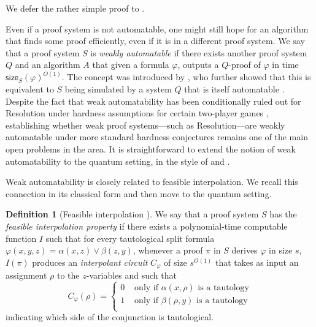 \documentclass[11pt]{article}
\theoremstyle{definition}
\newtheorem{definition}{Definition}[section]
\theoremstyle{plain}
\theoremstyle{remark}
\newcommand{\size}[2]{\mathsf{size}_{#1}(#2)}
\begin{document}
We defer the rather simple proof to .

Even if a proof system is not automatable, one might still hope for an algorithm that finds some proof efficiently, even if it is in a different proof system. We say that a proof system $S$ is \emph{weakly automatable} if there exists another proof system $Q$ and an algorithm $A$ that given a formula $\varphi$, outputs a $Q$-proof of $\varphi$ in time $\size{S}{\varphi}^{O(1)}$. The concept was introduced by \citeauthor{AB04} \cite{AB04}, who further showed that this is equivalent to $S$ being simulated by a system $Q$ that is itself automatable \autocite[Thm.\ 1]{AB04}. Despite the fact that weak automatability has been conditionally ruled out for Resolution under hardness assumptions for certain two-player games \cite{atseriasManeva, huangPitassi, BPT14}, establishing whether weak proof systems---such as Resolution---are weakly automatable under more standard hardness conjectures remains one of the main open problems in the area. It is straightforward to extend the notion of weak automatability to the quantum setting, in the style of  and .

Weak automatability is closely related to feasible interpolation. We recall this connection in its classical form and then move to the quantum setting.

\begin{definition}[Feasible interpolation \cite{Kra97, pudlak03}]
\label{def:fi}
We say that a proof system $S$ has the \emph{feasible interpolation property} if there exists a polynomial-time computable function $I$ such that for every tautological split formula $\varphi(x, y, z) = \alpha(x, z) \lor \beta(z, y)$, whenever a proof $\pi$ in $S$ derives $\varphi$ in size $s$, $I(\pi)$ produces an \emph{interpolant circuit} $C_{\varphi}$ of size $s^{O(1)}$ that takes as input an assignment $\rho$ to the $z$-variables and such that
\begin{equation*}
    C_\varphi(\rho) = \begin{cases}
        0 &\text{ only if } \alpha(x, \rho) \text{ is a tautology} \\
        1 &\text{ only if } \beta(\rho, y) \text{ is a tautology} \\
    \end{cases}
\end{equation*}
indicating which side of the conjunction is tautological.
\end{definition}
\end{document}
